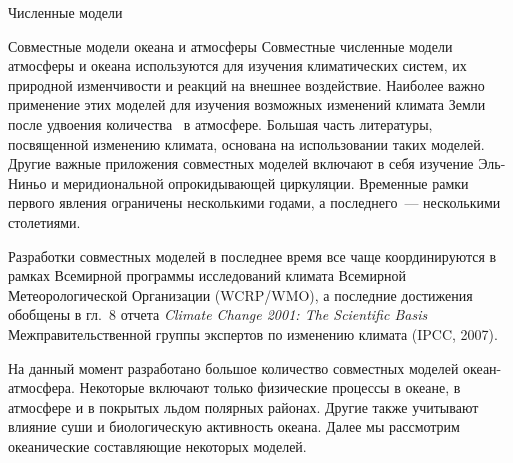 \begin{chapter}{Численные модели}
\begin{section}{Совместные модели океана и атмосферы}\label{sec:CoupledModels}
Совместные численные модели атмосферы и океана используются для изучения
климатических систем, их природной изменчивости и реакций на внешнее
воздействие. Наиболее важно применение этих моделей для изучения возможных
изменений климата Земли после удвоения количества~\COtwo{} в атмосфере. 
Большая часть литературы, посвященной изменению климата, основана на
использовании таких моделей. Другие важные приложения совместных моделей
включают в себя изучение Эль-Ниньо и меридиональной опрокидывающей 
циркуляции. 
Временные рамки первого явления ограничены несколькими годами, 
а последнего~--- несколькими столетиями.
%

Разработки совместных моделей в последнее время все чаще координируются
в рамках Всемирной программы исследований климата Всемирной Метеорологической
Организации (WCRP/WMO), а последние достижения обобщены в гл.~8
отчета \textit{Climate Change 2001: The Scientific Basis} 
Межправительственной группы экспертов по изменению климата (IPCC, 2007).
%

На данный момент разработано большое количество совместных моделей 
океан-атмосфера. 
Некоторые включают только физические процессы в
океане, в атмосфере и в покрытых льдом полярных районах. Другие
также учитывают влияние суши и биологическую активность океана.
Далее мы рассмотрим океанические составляющие некоторых моделей.
%


\end{section}
\end{chapter}
